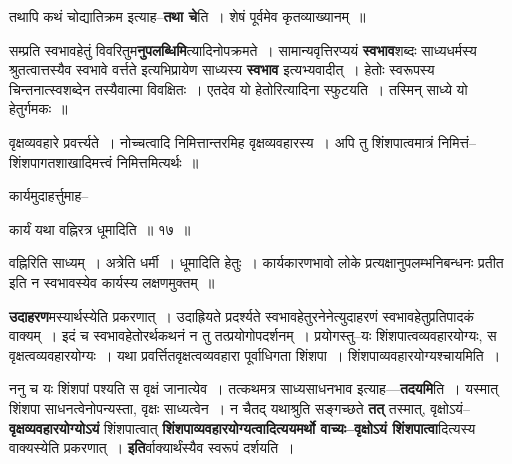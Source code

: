 \documentclass[article,12pt,a4paper]{memoir}
\begin{document}
	  \pstart तथापि कथं चोद्यातिक्रम इत्याह--\textbf{तथा चे}ति । शेषं पूर्वमेव कृतव्याख्यानम् ॥
	\pend
      

	  \pstart सम्प्रति स्वभावहेतुं विवरितुम\textbf{नुपलब्धिमि}त्यादिनोपक्रमते । सामान्यवृत्तिरप्ययं \textbf{स्वभाव}शब्दः साध्यधर्मस्य श्रुतत्वात्तस्यैव स्वभावे वर्त्तते इत्यभिप्रायेण साध्यस्य \textbf{स्वभाव} इत्यभ्यवादीत् । हेतोः स्वरूपस्य चिन्तनात्स्वशब्देन तस्यैवात्मा विवक्षितः । एतदेव यो हेतोरित्यादिना स्फुटयति । तस्मिन् साध्ये यो हेतुर्गमकः ॥
	\pend
	  \bigskip
	  \begingroup
	

	  \pstart वृक्षव्यवहारे प्रवर्त्त्यते । नोच्चत्वादि निमित्तान्तरमिह वृक्षव्यवहारस्य । अपि तु शिंशपात्वमात्रं निमित्तं--शिंशपागतशाखादिमत्त्वं निमित्तमित्यर्थः ॥
	\pend
        

	  \pstart कार्यमुदाहर्त्तुमाह--
	\pend
        
	  \bigskip
	  \begingroup
	

	  \pstart कार्यं यथा वह्निरत्र धूमादिति ॥ १७ ॥
	\pend
      
	  \endgroup
	 

	  \pstart {}वह्निरिति साध्यम् । अत्रेति धर्मी । धूमादिति हेतुः । कार्यकारणभावो लोके प्रत्यक्षानुपलम्भनिबन्धनः प्रतीत इति न स्वभावस्येव कार्यस्य लक्षणमुक्तम् ॥
	\pend
      
	  \endgroup
	

	  \pstart \textbf{उदाहरण}मस्यार्थस्येति प्रकरणात् । उदाह्रियते प्रदर्श्यते स्वभावहेतुरनेनेत्युदाहरणं स्वभावहेतुप्रतिपादकं वाक्यम् । इदं च स्वभावहेतोरर्थकथनं न तु तत्प्रयोगोपदर्शनम् । प्रयोगस्तु--यः शिंशपात्वव्यवहारयोग्यः, स वृक्षत्वव्यवहारयोग्यः । यथा प्रवर्त्तितवृक्षत्वव्यवहारा पूर्वाधिगता शिंशपा । शिंशपाव्यवहारयोग्यश्चायमिति ।
	\pend
      

	  \pstart ननु च यः शिंशपां पश्यति स वृक्षं जानात्येव । तत्कथमत्र साध्यसाधनभाव इत्याह—\textbf{तदयमि}ति । यस्मात् शिंशपा साधनत्वेनोपन्यस्ता, वृक्षः साध्यत्वेन । न चैतद् यथाश्रुति सङ्गच्छते \textbf{तत्} तस्मात्, वृक्षोऽयं--\textbf{वृक्षव्यवहारयो}\leavevmode{}\textbf{ग्योऽयं} शिंशपात्वात् \textbf{शिंशपाव्यवहारयोग्यत्वादित्ययमर्थो वाच्यः--वृक्षोऽयं शिंशपात्वा}दित्यस्य वाक्यस्येति प्रकरणात् । \textbf{इति}र्वाक्यार्थंस्यैव स्वरूपं दर्शयति ।
	\pend
      
\end{document}
